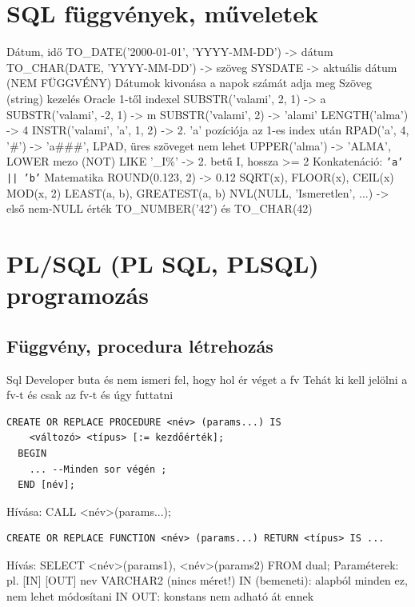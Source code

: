 \documentclass[12pt,a4paper]{article}
\begin{document}
\pagebreak

\section{SQL függvények, műveletek}

\begin{outline}
	\1 Dátum, idő
		\2 TO\_DATE('2000-01-01', 'YYYY-MM-DD') -> dátum
		\2 TO\_CHAR(DATE, 'YYYY-MM-DD') -> szöveg
		\2 SYSDATE -> aktuális dátum \;\;\; (NEM FÜGGVÉNY)
		\2 Dátumok kivonása a napok számát adja meg
	\1 Szöveg (string) kezelés
		\2 Oracle 1-től indexel
		\2 SUBSTR('valami', 2, 1) -> a
		\2 SUBSTR('valami', -2, 1) -> m
		\2 SUBSTR('valami', 2) -> 'alami'
		\2 LENGTH('alma') -> 4
		\2 INSTR('valami', 'a', 1, 2) -> 2. 'a' pozíciója az 1-es index után
		\2 RPAD('a', 4, '\#') -> 'a\#\#\#', LPAD, üres szöveget nem lehet
		\2 UPPER('alma') -> 'ALMA', LOWER
		\2 mezo (NOT) LIKE '\_I\%' -> 2. betű I, hossza >= 2
		\2 Konkatenáció: \texttt{'a' || 'b'}
	\1 Matematika
		\2 ROUND(0.123, 2) -> 0.12
		\2 SQRT(x), FLOOR(x), CEIL(x)
		\2 MOD(x, 2)
		\2 LEAST(a, b), GREATEST(a, b)
	\1 NVL(NULL, 'Ismeretlen', ...) -> első nem-NULL érték
	\1 TO\_NUMBER('42') és TO\_CHAR(42)
\end{outline}

\pagebreak

\section{PL/SQL (PL SQL, PLSQL) programozás}

\subsection{Függvény, procedura létrehozás}

\begin{outline}
	\1 Sql Developer buta és nem ismeri fel, hogy hol ér véget a fv
		\2 Tehát ki kell jelölni a fv-t és csak az fv-t és úgy futtatni
	\1 \begin{verbatim}
CREATE OR REPLACE PROCEDURE <név> (params...) IS
    <változó> <típus> [:= kezdőérték];
  BEGIN
    ... --Minden sor végén ;
  END [név];
	\end{verbatim}
		\2 Hívása: CALL <név>(params...);
	\1 \begin{verbatim}CREATE OR REPLACE FUNCTION <név> (params...) RETURN <típus> IS ...\end{verbatim}
		\2 Hívás: SELECT <név>(params1), <név>(params2) FROM dual;
	\1 Paraméterek: pl. [IN] [OUT] nev VARCHAR2 (nincs méret!)
		\2 IN (bemeneti): alapból minden ez, nem lehet módosítani
		\2 IN OUT: konstans nem adható át ennek
\end{outline}
\end{document}
